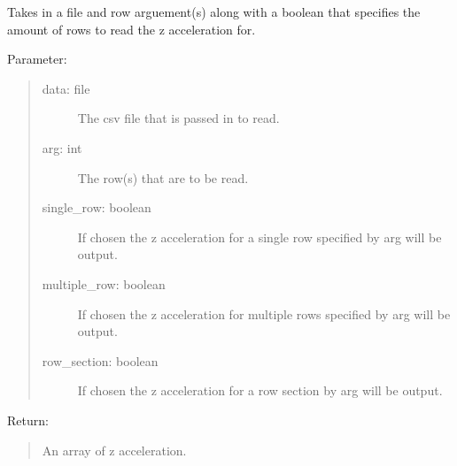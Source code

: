 \documentclass[letterpaper,10pt,english]{sphinxmanual}
\begin{document}
\begin{fulllineitems}
\label{\detokenize{Lidar extraction tool:imu_extract.get_z_accel}}
Takes in a file and row arguement(s) along with a boolean that specifies the amount of rows to read the z acceleration for.

Parameter:
\begin{quote}
\begin{description}
\item[{data: file}] \leavevmode
The csv file that is passed in to read.

\item[{arg: int}] \leavevmode
The row(s) that are to be read.

\item[{single\_row: boolean}] \leavevmode
If chosen the z acceleration for a single row specified by arg will be output.

\item[{multiple\_row: boolean}] \leavevmode
If chosen the z acceleration for multiple rows specified by arg will be output.

\item[{row\_section: boolean}] \leavevmode
If chosen the z acceleration for a row section by arg will be output.

\end{description}
\end{quote}

Return:
\begin{quote}

An array of z acceleration.
\end{quote}

\end{fulllineitems}

\end{document}

